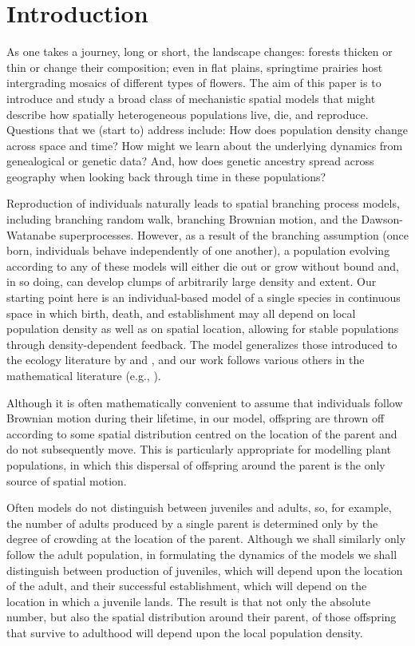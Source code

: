 \documentclass[EJP]{ejpecp} %
\newcommand{\citet}[1]{\cite{#1}}
\begin{document}
\section{Introduction}
\label{introduction}

As one takes a journey, long or short, the landscape changes:
forests thicken or thin or change their composition;
even in flat plains,
springtime prairies host intergrading mosaics of different types of flowers.
The aim of this paper is to introduce and study
a broad class of mechanistic spatial models
that might describe how spatially heterogeneous populations live, die, and reproduce.
Questions that we (start to) address include:
How does population density change across space and time?
How might we learn about the underlying dynamics from genealogical or genetic data?
And, how does genetic ancestry spread across geography
when looking back through time in these populations?

Reproduction of individuals naturally leads to spatial branching process models,
including branching random walk, 
branching Brownian motion, and the Dawson-Watanabe superprocesses.  
However, as a result of the branching assumption (once born, individuals behave 
independently of one another), 
a population evolving according to any of these models will
either die out or grow without bound and, in so doing, can
develop clumps of arbitrarily large density and extent. 
Our starting point here is an individual-based model of a single species 
in continuous space in which
birth, death, and establishment may all depend on local population density
as well as on spatial location,
allowing for stable populations through density-dependent feedback.
The model generalizes those introduced to the ecology literature by
\citet{bolker/pacala:1997} and \citet{law/murrell/dieckmann:2003},
and our work follows various others in the mathematical literature
(e.g., \citet{etheridge:2004,fournier2004microscopic}).

Although it is often mathematically convenient to assume that individuals follow
Brownian motion during their lifetime, 
in our model, offspring are thrown off according to some 
spatial distribution centred on the location of the parent
and do not subsequently move.
This is particularly appropriate for modelling plant populations, in which
this dispersal of offspring around the parent is the only source of
spatial motion.

Often models do not distinguish between juveniles and adults, so,
for example, the number of adults produced by a single parent is determined only
by the degree of crowding at the location of the parent.
Although we shall similarly only follow the adult population, in formulating the dynamics of the
models we shall distinguish
between production of juveniles, which will depend upon the location of 
the adult, and their successful establishment, which will depend on the
location in which a juvenile lands. The result is that not only the absolute 
number, but also the spatial distribution
around their parent, 
of those offspring that survive to adulthood
will depend upon the local population 
density. 
\end{document}

